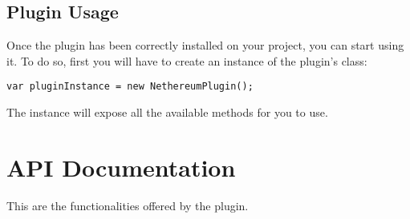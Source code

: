 \documentclass[a4paper, 11pt, titlepage]{article}
\begin{document}
\subsection{Plugin Usage}
\label{sec:orge521ee7}

Once the plugin has been correctly installed on your project, you can start using it. To do so, first you will have to create an instance of the plugin's class:

\begin{verbatim}
var pluginInstance = new NethereumPlugin();
\end{verbatim}

\noindent
The instance will expose all the available methods for you to use.

\section{API Documentation}
\label{sec:org1a0d7cc}

This are the functionalities offered by the plugin.
\end{document}

